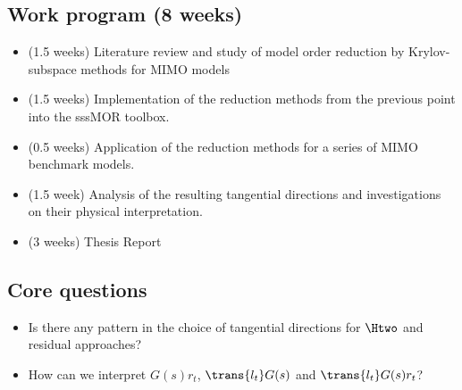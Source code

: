 \subsection{Work program (8 weeks)}
\begin{itemize}
	\item (1.5 weeks) Literature review and study of model order reduction by Krylov-subspace methods for MIMO models \parencite{Wilson_1974,Beattie_2014_Survey,Druskin_2014,Beattie_2009_TrustRegion,Gallivan_2004_MIMO,VanDooren_2008,VanDooren_2010}
	\item (1.5 weeks) Implementation of the reduction methods from the previous point into the sssMOR toolbox.
	\item (0.5 weeks) Application of the reduction methods for a series of MIMO benchmark models.		
	\item (1.5 week) Analysis of the resulting tangential directions and investigations on their physical interpretation.
	\item (3 weeks) Thesis Report
\end{itemize}

\subsection{Core questions}
\begin{itemize}
	\item Is there any pattern in the choice of tangential directions for $\Htwo$ and residual approaches?
	\item How can we interpret $G(s)r_t$, $\trans{l_t}G(s)$ and $\trans{l_t}G(s)r_t$?
\end{itemize}
